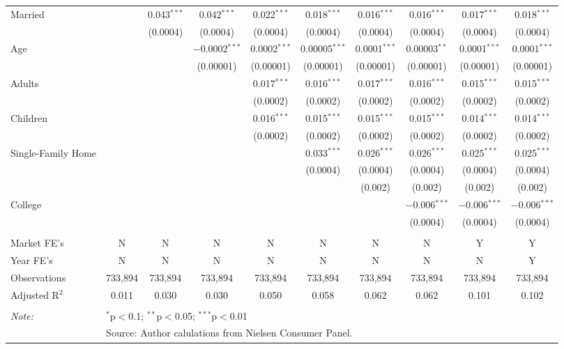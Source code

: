 \begin{table}[!htbp]
\begin{tabular}{@{\extracolsep{5pt}}lccccccccc}
  Married &  & 0.043$^{***}$ & 0.042$^{***}$ & 0.022$^{***}$ & 0.018$^{***}$ & 0.016$^{***}$ & 0.016$^{***}$ & 0.017$^{***}$ & 0.018$^{***}$ \\ 
  &  & (0.0004) & (0.0004) & (0.0004) & (0.0004) & (0.0004) & (0.0004) & (0.0004) & (0.0004) \\ 
  Age &  &  & $-$0.0002$^{***}$ & 0.0002$^{***}$ & 0.00005$^{***}$ & 0.0001$^{***}$ & 0.00003$^{**}$ & 0.0001$^{***}$ & 0.0001$^{***}$ \\ 
  &  &  & (0.00001) & (0.00001) & (0.00001) & (0.00001) & (0.00001) & (0.00001) & (0.00001) \\ 
  Adults &  &  &  & 0.017$^{***}$ & 0.016$^{***}$ & 0.017$^{***}$ & 0.016$^{***}$ & 0.015$^{***}$ & 0.015$^{***}$ \\ 
  &  &  &  & (0.0002) & (0.0002) & (0.0002) & (0.0002) & (0.0002) & (0.0002) \\ 
  Children &  &  &  & 0.016$^{***}$ & 0.015$^{***}$ & 0.015$^{***}$ & 0.015$^{***}$ & 0.014$^{***}$ & 0.014$^{***}$ \\ 
  &  &  &  & (0.0002) & (0.0002) & (0.0002) & (0.0002) & (0.0002) & (0.0002) \\ 
  Single-Family Home &  &  &  &  & 0.033$^{***}$ & 0.026$^{***}$ & 0.026$^{***}$ & 0.025$^{***}$ & 0.025$^{***}$ \\ 
  &  &  &  &  & (0.0004) & (0.0004) & (0.0004) & (0.0004) & (0.0004) \\ 
  &  &  &  &  &  & (0.002) & (0.002) & (0.002) & (0.002) \\ 
  College &  &  &  &  &  &  & $-$0.006$^{***}$ & $-$0.006$^{***}$ & $-$0.006$^{***}$ \\ 
  &  &  &  &  &  &  & (0.0004) & (0.0004) & (0.0004) \\ 
 \hline \\[-1.8ex] 
Market FE's & N & N & N & N & N & N & N & Y & Y \\ 
Year FE's & N & N & N & N & N & N & N & N & Y \\ 
Observations & 733,894 & 733,894 & 733,894 & 733,894 & 733,894 & 733,894 & 733,894 & 733,894 & 733,894 \\ 
Adjusted R$^{2}$ & 0.011 & 0.030 & 0.030 & 0.050 & 0.058 & 0.062 & 0.062 & 0.101 & 0.102 \\ 
\hline 
\hline \\[-1.8ex] 
\textit{Note:}  & \multicolumn{9}{l}{$^{*}$p$<$0.1; $^{**}$p$<$0.05; $^{***}$p$<$0.01} \\ 
 & \multicolumn{9}{l}{Source: Author calulations from Nielsen Consumer Panel.} \\ 
\end{tabular} 
\end{table} 
